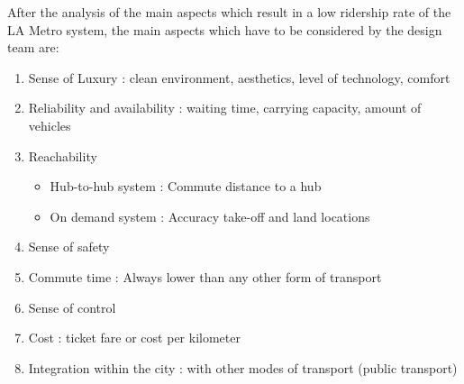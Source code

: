 After the analysis of the main aspects which result in a low ridership rate of the LA Metro system, the main aspects which have to be considered by the design team are:
\begin{enumerate}
    \item Sense of Luxury : clean environment, aesthetics, level of technology, comfort
    \item Reliability and availability : waiting time, carrying capacity, amount of vehicles 
    \item Reachability 
    \begin{itemize}
        \item Hub-to-hub system : Commute distance to a hub  
        \item On demand system : Accuracy take-off and land locations
    \end{itemize}
    \item Sense of safety
    \item Commute time : Always lower than any other form of transport
    \item Sense of control
    \item Cost : ticket fare or cost per kilometer
    \item Integration within the city : with other modes of transport (public transport)
\end{enumerate}


